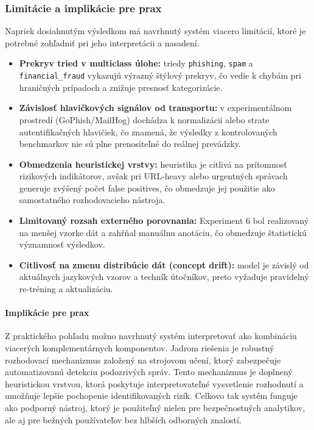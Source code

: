 \documentclass[conference]{IEEEtran}
\begin{document}
\subsubsection*{Limitácie a implikácie pre prax}

Napriek dosiahnutým výsledkom má navrhnutý systém viacero limitácií,
ktoré je potrebné zohľadniť pri jeho interpretácii a nasadení.

\begin{itemize}
    \item \textbf{Prekryv tried v multiclass úlohe:}
    triedy \texttt{phishing}, \texttt{spam} a \texttt{financial\_fraud}
    vykazujú výrazný štýlový prekryv,
    čo vedie k chybám pri hraničných prípadoch a znižuje presnosť kategorizácie.

    \item \textbf{Závislosť hlavičkových signálov od transportu:}
    v experimentálnom prostredí (GoPhish/MailHog) dochádza k normalizácii
    alebo strate autentifikačných hlavičiek,
    čo znamená, že výsledky z kontrolovaných benchmarkov nie sú
    plne prenositeľné do reálnej prevádzky.

    \item \textbf{Obmedzenia heuristickej vrstvy:}
    heuristika je citlivá na prítomnosť rizikových indikátorov,
    avšak pri URL-heavy alebo urgentných správach generuje zvýšený počet
    false positives, čo obmedzuje jej použitie ako samostatného rozhodovacieho nástroja.

    \item \textbf{Limitovaný rozsah externého porovnania:}
    Experiment 6 bol realizovaný na menšej vzorke dát
    a zahŕňal manuálnu anotáciu,
    čo obmedzuje štatistickú významnosť výsledkov.

    \item \textbf{Citlivosť na zmenu distribúcie dát (concept drift):}
    model je závislý od aktuálnych jazykových vzorov a techník útočníkov,
    preto vyžaduje pravidelný re-tréning a aktualizáciu.

\end{itemize}

\paragraph{Implikácie pre prax}

Z praktického pohľadu možno navrhnutý systém interpretovať ako
kombináciu viacerých komplementárnych komponentov. Jadrom riešenia
je robustný rozhodovací mechanizmus založený na strojovom učení,
ktorý zabezpečuje automatizovanú detekciu podozrivých správ.
Tento mechanizmus je doplnený heuristickou vrstvou, ktorá poskytuje
interpretovateľné vysvetlenie rozhodnutí a umožňuje lepšie pochopenie
identifikovaných rizík. Celkovo tak systém funguje ako podporný nástroj,
ktorý je použiteľný nielen pre bezpečnostných analytikov, ale aj pre
bežných používateľov bez hlbších odborných znalostí.
\end{document}
